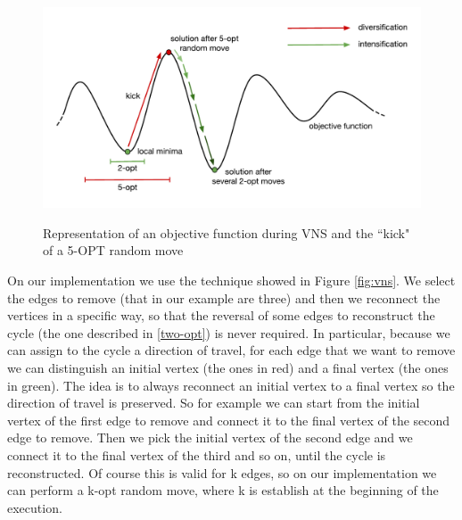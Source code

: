 \begin{figure}[h!]
\centering
	\includegraphics[scale=0.77]{media/vns_graph.pdf} \\
	\caption{Representation of an objective function during VNS and the ``kick" of a 5-OPT random move}
\end{figure}

\noindent On our implementation we use the technique showed in Figure \ref{fig:vns}. We select the edges to remove (that in our example are three) and then we reconnect the vertices in a specific way, so that the reversal of some edges to reconstruct the cycle (the one described in \ref{two-opt}) is never required. In particular, because we can assign to the cycle a direction of travel, for each edge that we want to remove we can distinguish an initial vertex (the ones in red) and a final vertex (the ones in green). The idea is to always reconnect an initial vertex to a final vertex so the direction of travel is preserved. So for example we can start from the initial vertex of the first edge to remove and connect it to the final vertex of the second edge to remove. Then we pick the initial vertex of the second edge and we connect it to the final vertex of the third and so on, until the cycle is reconstructed. Of course this is valid for k edges, so on our implementation we can perform a k-opt random move, where k is establish at the beginning of the execution.

